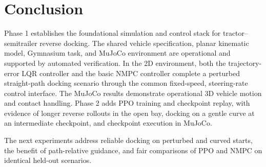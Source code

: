 \documentclass[conference]{IEEEtran}
\begin{document}
\section{Conclusion}

Phase 1 establishes the foundational simulation and control stack for
tractor--semitrailer reverse docking. The shared vehicle specification, planar
kinematic model, Gymnasium task, and MuJoCo environment are operational and
supported by automated verification. In the 2D environment, both the
trajectory-error LQR controller and the basic NMPC controller complete a
perturbed straight-path docking scenario through the common fixed-speed,
steering-rate control interface. The MuJoCo results demonstrate operational
3D vehicle motion and contact handling. Phase 2 adds PPO training and
checkpoint replay, with evidence of longer reverse rollouts in the open
bay, docking on a gentle curve at an intermediate checkpoint, and
checkpoint execution in MuJoCo.

The next experiments address reliable docking on perturbed and curved
starts, the benefit of path-relative guidance, and fair comparisons of PPO
and NMPC on identical held-out scenarios.



\end{document}
